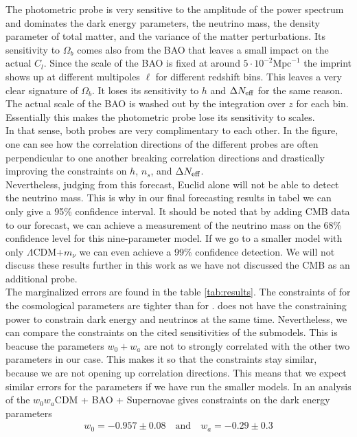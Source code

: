 \documentclass[../main.tex]{subfiles}
\begin{document}
    The photometric probe is very sensitive to the amplitude of the power spectrum and dominates the dark energy parameters, the neutrino mass, the density parameter of total matter, and the variance of the matter perturbations. Its sensitivity to $\Omega_b$ comes also from the BAO that leaves a small impact on the actual $C_l$. Since the scale of the BAO is fixed at around $5\cdot10^{-2} \mathrm{Mpc}^{-1}$ the imprint shows up at different multipoles $\ell$ for different redshift bins. This leaves a very clear signature of $\Omega_b$. It loses its sensitivity to $h$ and $\Delta N_\mathrm{eff}$ for the same reason. The actual scale of the BAO is washed out by the integration over $z$ for each bin. Essentially this makes the photometric probe lose its sensitivity to scales.\\
    In that sense, both probes are very complimentary to each other. In the figure, one can see how the correlation directions of the different probes are often perpendicular to one another breaking correlation directions and drastically improving the constraints on $h$, $n_s$, and $\Delta N_\mathrm{eff}$.\\
    Nevertheless, judging from this forecast, Euclid alone will not be able to detect the neutrino mass. This is why in our final forecasting results in tabel we can only give a 95\% confidence interval. It should be noted that by adding CMB data to our forecast, we can achieve a measurement of the neutrino mass on the 68\% confidence level for this nine-parameter model. If we go to a smaller model with only $\Lambda$CDM+$m_\nu$ we can even achieve a 99\% confidence detection. We will not discuss these results further in this work as we have not discussed the CMB as an additional probe.\\
    The marginalized errors are found in the table \ref{tab:results}. The constraints of \Euclid for the cosmological parameters are tighter than for \Planck. \Planck does not have the constraining power to constrain dark energy and neutrinos at the same time. Nevertheless, we can compare the constraints on the cited sensitivities of the submodels. This is beacuse the parameters $w_0+w_a$ are not to strongly correlated with the other two parameters  in our case. This makes it so that the constraints stay similar, because we are not opening up correlation directions. This means that we expect similar errors for the parameters if we have run the smaller models. In an analysis of the $w_0w_a$CDM \Planck + BAO + Supernovae gives constraints on the dark energy parameters \begin{align*}
        w_0 = -0.957 \pm 0.08 \quad \text{and}\quad w_a = -0.29 \pm 0.3
    \end{align*}
\end{document}
